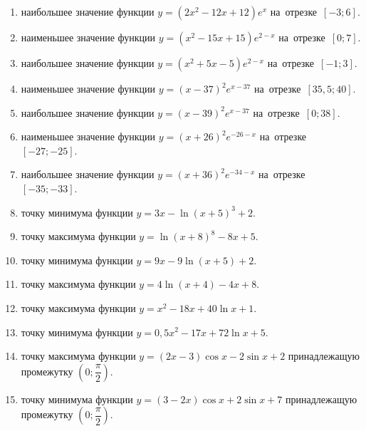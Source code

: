 \documentclass[a4paper,10pt]{article}
\begin{document}
\begin{enumerate}
\item {} наибольшее значение функции $y=\left(2x^2 -12x +12\right)e^{x}$ на~отрезке~$\left[-3;6\right]$.

\item {} наименьшее значение функции $y=\left(x^2 -15x +15\right)e^{2-x}$ на~отрезке~$\left[0;7\right]$.

\item {} наибольшее значение функции $y=\left(x^2 +5x -5\right)e^{2-x}$ на~отрезке~$\left[-1;3\right]$.

\item {} наименьшее значение функции $y=\left(x-37\right)^2e^{x-37}$ на~отрезке~$\left[35,5;40\right]$.

\item {} наибольшее значение функции $y=\left(x-39\right)^2e^{x-37}$ на~отрезке~$\left[0;38\right]$.

\item {} наименьшее значение функции $y=\left(x+26\right)^2e^{-26-x}$ на~отрезке~$\left[-27;-25\right]$.

\item {} наибольшее значение функции $y=\left(x+36\right)^2e^{-34-x}$ на~отрезке~$\left[-35;-33\right]$.

\item {} точку минимума функции $y=3x-\ln\left(x+5\right)^{3}+2$.

\item {} точку максимума функции $y=\ln\left(x+8\right)^{8}-8x+5$.

\item {} точку минимума функции $y=9x-9\ln\left(x+5\right)+2$.

\item {} точку максимума функции $y=4\ln\left(x+4\right)-4x+8$.

\item {} точку максимума функции $y=x^2-18x+40\ln x +1$.

\item {} точку минимума функции $y=0,5x^2-17x+72\ln x +5$.

\item {} точку максимума функции $y=\left(2x-3\right)\cos x -2\sin x+2$
принадлежащую промежутку $\left(0;\dfrac{\pi}{2}\right)$.

\item {} точку минимума функции $y=\left(3-2x\right)\cos x +2\sin x+7$
принадлежащую промежутку $\left(0;\dfrac{\pi}{2}\right)$.


\end{enumerate}
\end{document}
